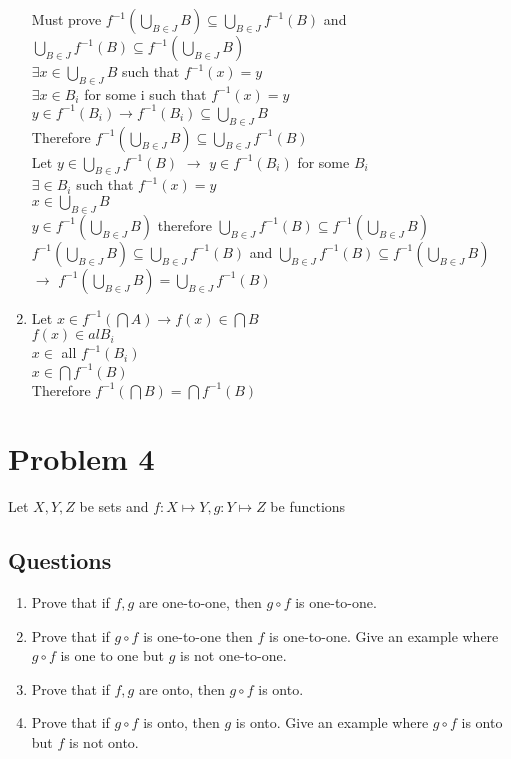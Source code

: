\documentclass{article}
\begin{document}
\begin{enumerate}[label=\alph*]
Must prove \(f^{-1}(\bigcup\limits_{B \in J}B) \subseteq \bigcup\limits_{B \in J}f^{-1}(B)\) and \(\bigcup\limits_{B \in J}f^{-1}(B) \subseteq f^{-1}(\bigcup\limits_{B \in J}B)\) \\ \(\exists x \in \bigcup\limits_{B \in J}B\) such that \(f^{-1}(x) = y\) \\ \(\exists x \in B_i\) for some i such that \(f^{-1}(x) = y\) \\ \(y \in f^{-1}(B_i) \rightarrow f^{-1}(B_i) \subseteq \bigcup\limits_{B \in J}B \) \\ Therefore \(f^{-1}(\bigcup\limits_{B \in J}B) \subseteq \bigcup\limits_{B \in J}f^{-1}(B)\)  \\ Let \(y \in \bigcup\limits_{B \in J}f^{-1}(B)\) \(\rightarrow\) \(y \in f^{-1}(B_i)\) for some \(B_i\) \\ \(\exists \in B_i\) such that \(f^{-1}(x) = y \) \\ \(x \in \bigcup\limits_{B \in J}B\) \\ \(y \in f^{-1}(\bigcup\limits_{B \in J}B)\) therefore \(\bigcup\limits_{B \in J}f^{-1}(B) \subseteq f^{-1}(\bigcup\limits_{B \in J}B)\) \\ \(f^{-1}(\bigcup\limits_{B \in J}B) \subseteq \bigcup\limits_{B \in J}f^{-1}(B)\) and \(\bigcup\limits_{B \in J}f^{-1}(B) \subseteq f^{-1}(\bigcup\limits_{B \in J}B)\) \(\rightarrow\) \(f^{-1}(\bigcup\limits_{B \in J}B) = \bigcup\limits_{B \in J}f^{-1}(B)\)
\item Let \(x \in f^{-1}(\bigcap A) \rightarrow f(x) \in \bigcap B\) \\ \(f(x) \in al B_{i}\) \\ \(x \in \) all \( f^{-1}(B_{i})\) \\ \(x \in \bigcap f^{-1}(B) \) \\ Therefore \(f^{-1}(\bigcap B) = \bigcap f^{-1}(B)\) 
\end{enumerate}
\section*{Problem 4}
Let \(X, Y, Z\) be sets and \(f : X \mapsto Y, g: Y \mapsto Z\) be functions
\subsection*{Questions}
\begin{enumerate}[label=\alph*]
\item Prove that if \(f, g\) are one-to-one, then \(g \circ f\) is one-to-one.
\item Prove that if \(g \circ f\) is one-to-one then \(f\) is one-to-one. Give an example where \(g \circ f\) is one to one but \(g\) is not one-to-one.
\item Prove that if \(f, g\) are onto, then \(g \circ f\) is onto.
\item Prove that if \(g \circ f\) is onto, then \(g\) is onto. Give an example where \(g \circ f\) is onto but \(f\) is not onto.
\end{enumerate}
\end{document}
